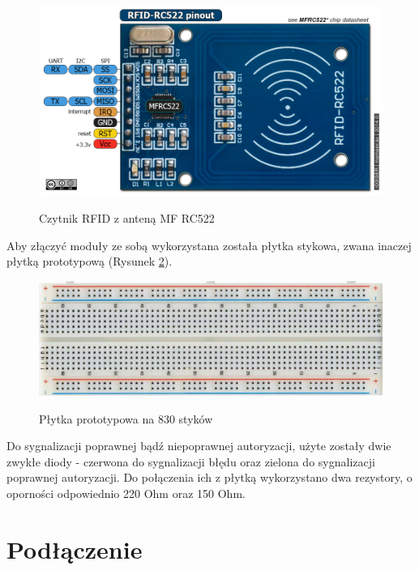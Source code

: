 \begin{figure}[h!]
	\centering
	\includegraphics[width=\linewidth]{img/RFID-RC522-pinout.png}
	\label{fig:rfid}
	\caption[Czytnik RFID z anteną MF RC522]{Czytnik RFID z anteną MF RC522\footnotemark}
\end{figure}

Aby złączyć moduły ze sobą wykorzystana została płytka stykowa, zwana inaczej płytką prototypową (Rysunek \ref{fig:stykowa}).

\begin{figure}[h!]
	\centering
	\includegraphics[width=\linewidth]{img/plytka-stykowa.jpg}
	\label{fig:stykowa}
	\caption[Płytka prototypowa na 830 styków]{Płytka prototypowa na 830 styków\footnotemark}
\end{figure}

Do sygnalizacji poprawnej bądź niepoprawnej autoryzacji, użyte zostały dwie zwykłe diody - czerwona do sygnalizacji błędu oraz zielona do sygnalizacji poprawnej autoryzacji. Do połączenia ich z płytką wykorzystano dwa rezystory, o oporności odpowiednio 220 Ohm oraz 150 Ohm.

\section{Podłączenie}

